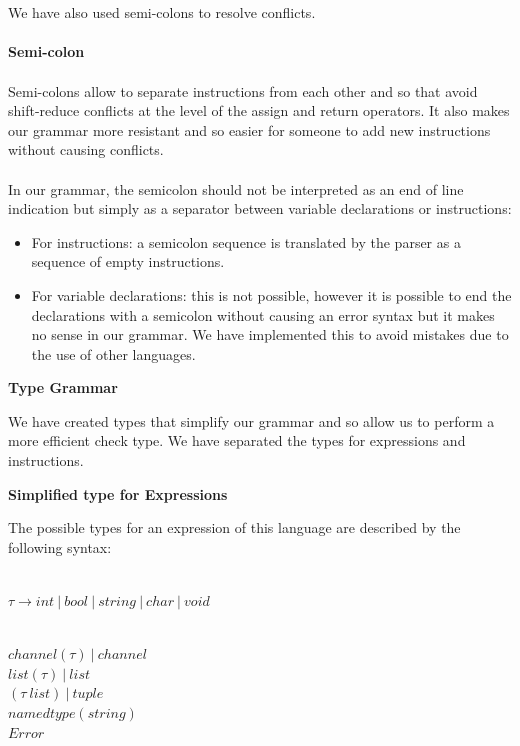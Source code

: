 \documentclass[11pt]{report}
\begin{document}
\\ \\
\newpage
We have also used semi-colons to resolve conflicts. \\ \\
\tabto{2cm} \textbf{Semi-colon} \\ \\
\tabto{1cm}Semi-colons allow to separate instructions from each other and so that avoid shift-reduce conflicts at the level of the assign and return operators. It also makes our grammar more resistant and so easier for someone to add new instructions without causing conflicts. \\ \\
\tabto{1cm} In our grammar, the semicolon should not be interpreted as an end of line indication but simply as a separator between variable declarations or instructions:
\begin{itemize}
\item For instructions: a semicolon sequence is translated by the parser as a sequence of empty instructions.
\item For variable declarations: this is not possible, however it is possible to end the declarations with a semicolon without causing an error syntax but it makes no sense in our grammar. We have implemented this to avoid mistakes due to the use of other languages.
\end{itemize}

\newpage
\centerline{\textbf{\Huge Type Grammar}}
\vspace*{3pt}
\vspace*{20pt}
We have created types that simplify our grammar and so allow us to perform a more efficient check type. We have separated the types for expressions and instructions.

\tabto{0cm} {\Large \textbf{Simplified type for Expressions}}

\tabto{0cm}The possible types for an expression of this language are described by the following syntax:
\\ \\
\centerline{$\tau \rightarrow int \ | \ bool \ | \ string \ | \ char \ | \ void$} \\
$ channel( \tau) \ | \ channel $ \\
$ list(\tau) \ | \ list $ \\
$ ( \tau \ list) \ | \ tuple $ \\
$ namedtype(string)$ \\
$ Error $
\end{document}
